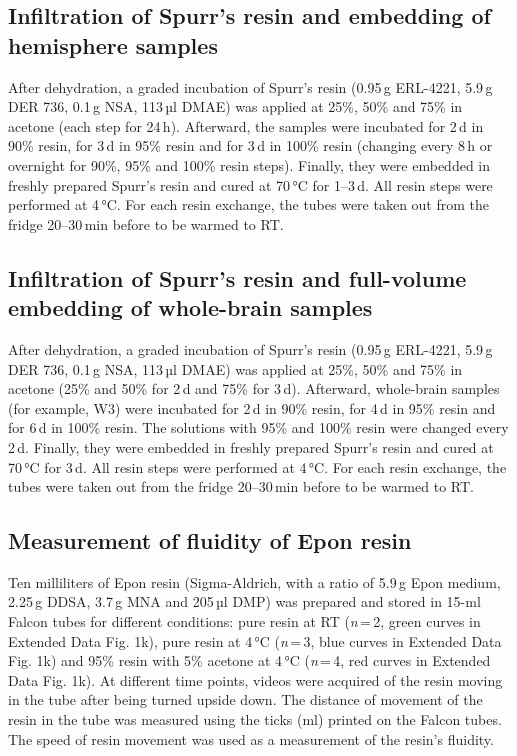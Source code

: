 \documentclass{article}
\begin{document}
\subsection*{Infiltration of Spurr’s resin and embedding of hemisphere samples}
After dehydration, a graded incubation of Spurr’s resin (0.95\,g ERL-4221, 5.9\,g DER 736, 0.1\,g NSA, 113\,µl DMAE) was applied at 25\%, 50\% and 75\% in acetone (each step for 24\,h). Afterward, the samples were incubated for 2\,d in 90\% resin, for 3\,d in 95\% resin and for 3\,d in 100\% resin (changing every 8\,h or overnight for 90\%, 95\% and 100\% resin steps). Finally, they were embedded in freshly prepared Spurr’s resin and cured at 70\,°C for 1–3\,d. All resin steps were performed at 4\,°C. For each resin exchange, the tubes were taken out from the fridge 20–30\,min before to be warmed to RT.

\subsection*{Infiltration of Spurr’s resin and full-volume embedding of whole-brain samples}
After dehydration, a graded incubation of Spurr’s resin (0.95\,g ERL-4221, 5.9\,g DER 736, 0.1\,g NSA, 113\,µl DMAE) was applied at 25\%, 50\% and 75\% in acetone (25\% and 50\% for 2\,d and 75\% for 3\,d). Afterward, whole-brain samples (for example, W3) were incubated for 2\,d in 90\% resin, for 4\,d in 95\% resin and for 6\,d in 100\% resin. The solutions with 95\% and 100\% resin were changed every 2\,d. Finally, they were embedded in freshly prepared Spurr’s resin and cured at 70\,°C for 3\,d. All resin steps were performed at 4\,°C. For each resin exchange, the tubes were taken out from the fridge 20–30\,min before to be warmed to RT.

\subsection*{Measurement of fluidity of Epon resin}
Ten milliliters of Epon resin (Sigma-Aldrich, with a ratio of 5.9\,g Epon medium, 2.25\,g DDSA, 3.7\,g MNA and 205\,µl DMP) was prepared and stored in 15-ml Falcon tubes for different conditions: pure resin at RT (\emph{n}\,=\,2, green curves in Extended Data Fig. 1k), pure resin at 4\,°C (\emph{n}\,=\,3, blue curves in Extended Data Fig. 1k) and 95\% resin with 5\% acetone at 4\,°C (\emph{n}\,=\,4, red curves in Extended Data Fig. 1k). At different time points, videos were acquired of the resin moving in the tube after being turned upside down. The distance of movement of the resin in the tube was measured using the ticks (ml) printed on the Falcon tubes. The speed of resin movement was used as a measurement of the resin’s fluidity.
\end{document}
